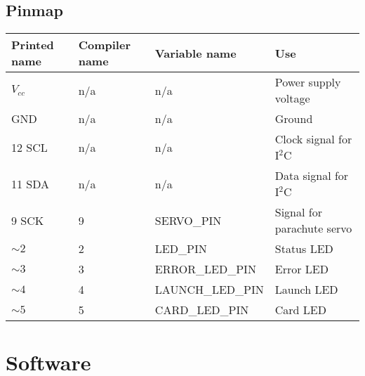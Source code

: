 \documentclass{article}
\begin{document}
\subsection*{Pinmap}
\begin{table}[H]
\begin{tabular}{llll}
Printed name & Compiler name & Variable name & Use \\
\hline
$V_{cc}$ & n/a & n/a & Power supply voltage \\
GND & n/a & n/a & Ground \\
12 SCL & n/a & n/a & Clock signal for I$^2$C \\
11 SDA & n/a & n/a & Data signal for I$^2$C \\
9 SCK & 9 & SERVO\_PIN & Signal for parachute servo \\
$\sim2$ & 2 & LED\_PIN & Status LED \\
$\sim3$ & 3 & ERROR\_LED\_PIN & Error LED \\
$\sim4$ & 4 & LAUNCH\_LED\_PIN & Launch LED \\
$\sim5$ & 5 & CARD\_LED\_PIN & Card LED \\
\end{tabular}
\end{table}

\section*{Software}
\end{document}
